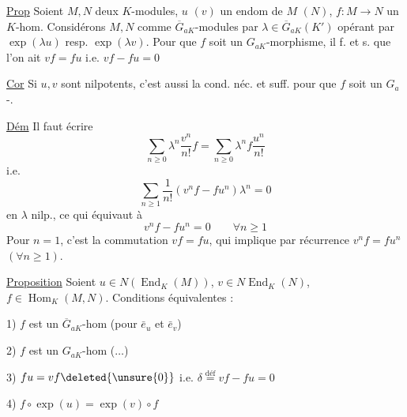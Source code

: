 \uline{Prop} Soient $M,N$ deux $K$-modules, $u$ $(v)$ un endom de $M$ $(N)$, $f:M\longrightarrow N$ un $K$-hom. Considérons $M,N$ comme $\overline G_{aK}$-modules par $\lambda\in\overline G_{aK}(K')$ opérant par $\exp(\lambda u)$ resp. $\exp(\lambda v)$. Pour que $f$ soit un $G_{aK}$-morphisme, il f. et s. que l'on ait $vf=fu$ i.e. $vf-fu=0$

\uline{Cor} Si $u,v$  sont nilpotents, c'est aussi la cond. néc. et suff. pour que $f$ soit un $G_a$-.

\uline{Dém} Il faut écrire
\[
\sum_{n\geq0}\lambda^n\frac{v^n}{n!}f=\sum_{n\geq0}\lambda^n f\frac{u^n}{n!}
\]
i.e.
\[
\sum_{n\geq1}\frac1{n!}(v^nf-fu^n)\lambda^n=0
\]
 en $\lambda$ nilp., ce qui équivaut à
\[
v^nf-fu^n=0\qquad\forall n\geq1
\]
Pour $n=1$, c'est la commutation $vf=fu$, qui implique par récurrence $v^nf=fu^n$ $(\forall n\geq1)$.

\uline{Proposition} Soient  $u\in N(\operatorname{End}_K(M))$, $v\in N\operatorname{End}_K(N)$, $f\in\operatorname{Hom}_K(M,N)$. Conditions équivalentes :

1) $f$ est un $\overline G_{aK}$-hom (pour  $\bar e_u$ et $\bar e_v$)

2) $f$ est un $G_{aK}$-hom ($\ldots$)

3) $fu=vf\deleted{\unsure{0}}$ i.e. $\delta\overset{\mathrm{déf}}=vf-fu=0$

4) $f\circ\exp(u)=\exp(v)\circ f$
